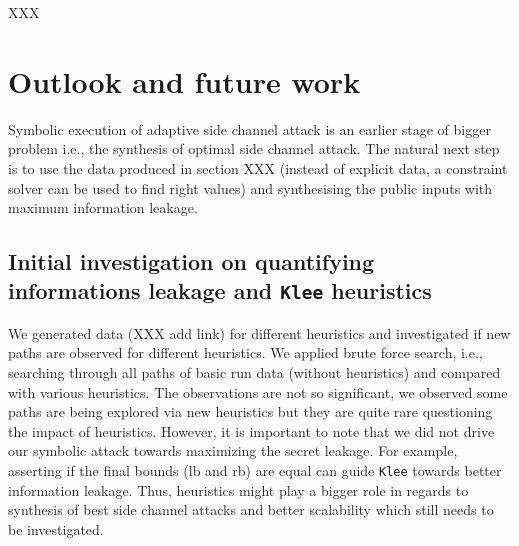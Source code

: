 \documentclass[11pt,a4paper,notitlepage]{article}
\begin{document}
XXX

\newpage

\section{Outlook and future work}
\label{sec:futurework}

Symbolic execution of adaptive side channel attack is an earlier stage of bigger problem i.e., the synthesis of optimal side channel attack.
The natural next step is to use the data produced in section XXX (instead of explicit data, a constraint solver can be used to find right values) and synthesising the public inputs with maximum information leakage.

\subsection{Initial investigation on quantifying informations leakage and \texttt{Klee} heuristics}
\label{subsec:initialinvestigationleakage}

We generated data (XXX add link) for different heuristics and investigated if new paths are observed for different heuristics.
We applied brute force search, i.e., searching through all paths of basic run data (without heuristics) and compared with various heuristics.
The observations are not so significant, we observed some paths are being explored via new heuristics but they are quite rare questioning the impact of heuristics.
However, it is important to note that we did not drive our symbolic attack towards maximizing the secret leakage.
For example, asserting if the final bounds (lb and rb) are equal can guide \texttt{Klee} towards better information leakage.
Thus, heuristics might play a bigger role in regards to synthesis of best side channel attacks and better scalability which still needs to be investigated.





\end{document}
